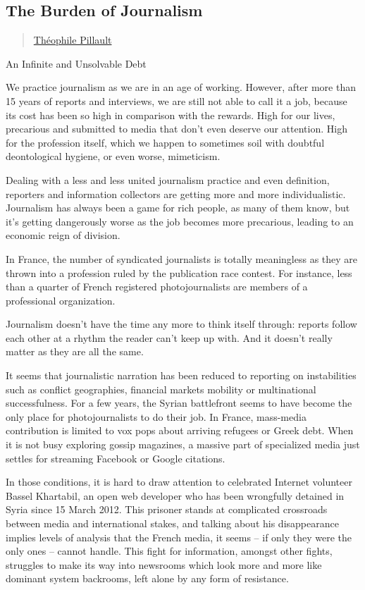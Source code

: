 \subsection{The Burden of Journalism}\label{the-burden-of-journalism}

\begin{quote}
\href{../appendix/attributions.html\#theophile-pillault}{Théophile
Pillault}
\end{quote}

An Infinite and Unsolvable Debt

We practice journalism as we are in an age of working. However, after
more than 15 years of reports and interviews, we are still not able to
call it a job, because its cost has been so high in comparison with the
rewards. High for our lives, precarious and submitted to media that
don't even deserve our attention. High for the profession itself, which
we happen to sometimes soil with doubtful deontological hygiene, or even
worse, mimeticism.

Dealing with a less and less united journalism practice and even
definition, reporters and information collectors are getting more and
more individualistic. Journalism has always been a game for rich people,
as many of them know, but it's getting dangerously worse as the job
becomes more precarious, leading to an economic reign of division.

In France, the number of syndicated journalists is totally meaningless
as they are thrown into a profession ruled by the publication race
contest. For instance, less than a quarter of French registered
photojournalists are members of a professional organization.

Journalism doesn't have the time any more to think itself through:
reports follow each other at a rhythm the reader can't keep up with. And
it doesn't really matter as they are all the same.

It seems that journalistic narration has been reduced to reporting on
instabilities such as conflict geographies, financial markets mobility
or multinational successfulness. For a few years, the Syrian battlefront
seems to have become the only place for photojournalists to do their
job. In France, mass-media contribution is limited to vox pops about
arriving refugees or Greek debt. When it is not busy exploring gossip
magazines, a massive part of specialized media just settles for
streaming Facebook or Google citations.

In those conditions, it is hard to draw attention to celebrated Internet
volunteer Bassel Khartabil, an open web developer who has been
wrongfully detained in Syria since 15 March 2012. This prisoner stands
at complicated crossroads between media and international stakes, and
talking about his disappearance implies levels of analysis that the
French media, it seems -- if only they were the only ones -- cannot
handle. This fight for information, amongst other fights, struggles to
make its way into newsrooms which look more and more like dominant
system backrooms, left alone by any form of resistance.

